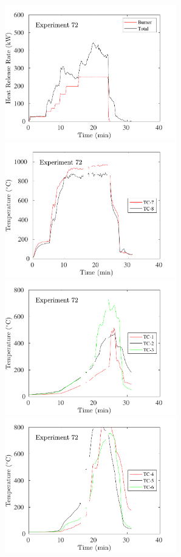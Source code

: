 \begin{figure}[H]
\includegraphics[height=2.30in]{../SCRIPT_FIGURES/Test_72_HRR} \hfill
\includegraphics[height=2.30in]{../SCRIPT_FIGURES/Test_72_TC_7-8} \\
\includegraphics[height=2.30in]{../SCRIPT_FIGURES/Test_72_TC_1-3} \hfill
\includegraphics[height=2.30in]{../SCRIPT_FIGURES/Test_72_TC_4-6}

\end{figure}

